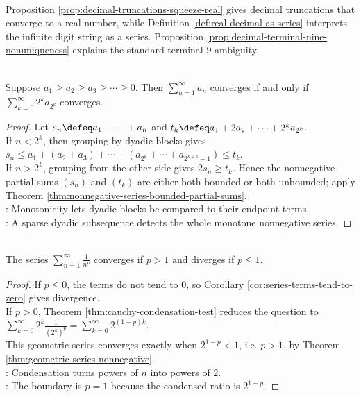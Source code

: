 \begin{perspective} \label{per:decimal-expansions-as-series} \\
Proposition \ref{prop:decimal-truncations-squeeze-real} gives decimal truncations that converge to a real number, while Definition \ref{def:real-decimal-as-series} interprets the infinite digit string as a series. Proposition \ref{prop:decimal-terminal-nine-nonuniqueness} explains the standard terminal-$9$ ambiguity.
\end{perspective}

\begin{theorem} \label{thm:cauchy-condensation-test} \\
Suppose $a_1\geq a_2\geq a_3\geq\cdots\geq0$. Then $\sum_{n=1}^{\infty}a_n$ converges if and only if $\sum\limits_{k=0}^{\infty}2^k a_{2^k}$ converges.
\begin{proof}
Let $s_n\defeq a_1+\cdots+a_n$ and $t_k\defeq a_1+2a_2+\cdots+2^k a_{2^k}$.\\
If $n<2^k$, then grouping by dyadic blocks gives $s_n\leq a_1+(a_2+a_3)+\cdots+(a_{2^k}+\cdots+a_{2^{k+1}-1})\leq t_k$.\\
If $n>2^k$, grouping from the other side gives $2s_n\geq t_k$. Hence the nonnegative partial sums $(s_n)$ and $(t_k)$ are either both bounded or both unbounded; apply Theorem \ref{thm:nonnegative-series-bounded-partial-sums}.\\
: Monotonicity lets dyadic blocks be compared to their endpoint terms.\\
: A sparse dyadic subsequence detects the whole monotone nonnegative series.
\end{proof}
\end{theorem}

\begin{corollary} \label{cor:p-series-test} \\
The series $\sum\limits_{n=1}^{\infty}\frac{1}{n^p}$ converges if $p>1$ and diverges if $p\leq1$.
\begin{proof}
If $p\leq0$, the terms do not tend to $0$, so Corollary \ref{cor:series-terms-tend-to-zero} gives divergence.\\
If $p>0$, Theorem \ref{thm:cauchy-condensation-test} reduces the question to $\sum\limits_{k=0}^{\infty}2^k\frac{1}{(2^k)^p}=\sum\limits_{k=0}^{\infty}2^{(1-p)k}$.\\
This geometric series converges exactly when $2^{1-p}<1$, i.e. $p>1$, by Theorem \ref{thm:geometric-series-nonnegative}.\\
: Condensation turns powers of $n$ into powers of $2$.\\
: The boundary is $p=1$ because the condensed ratio is $2^{1-p}$.
\end{proof}
\end{corollary}


